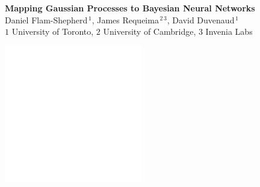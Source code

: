 \documentclass[landscape,a1,final,a4resizeable]{include/a0poster}
\begin{document}
\begin{minipage}[t][0pt]{\linewidth}
{{\begin{center}
   \Huge \textbf{Mapping Gaussian Processes to Bayesian Neural Networks}\vspace{3mm}\\
    \huge Daniel Flam-Shepherd$^{\,1}$, James Requeima$^{\,2\,3}$, David Duvenaud$^{\,1}$\\
    \color{white}\large 
    $1$ University of Toronto, $2$ University of Cambridge, $3$ Invenia Labs
    \end{center}
  }%
\hspace{1cm}
\parbox{.05\textwidth}{  
  \begin{flushright}\vspace{0.5cm}\includegraphics[height=6cm]{badges/inv_labs}\hfill%
  \end{flushright}}
}%



\begin{poster}%
\vspace{0\baselineskip}%
\vspace*{0.7cm}%
\large%
\noindent%

\begin{multicols}{3}


\begin{minipage}[t][47.5cm][t]{.32\textwidth}



\end{minipage}
\end{multicols}
\end{poster}
\end{minipage}
\end{document}
